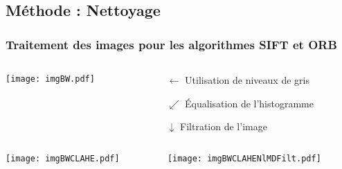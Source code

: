 \documentclass[8pt,aspectratio=169,hyperref={unicode=true}]{beamer}
\begin{document}
\subsection{Méthode : Nettoyage}
\subsubsection{Traitement des images pour les algorithmes SIFT et ORB}
\begin{frame}{\insertsubsection}{\insertsubsubsection}
    \begin{columns}
        \begin{column}{.5\textwidth}
            \texttt{[image: imgBW.pdf]}
        \end{column}
        \begin{column}{.5\textwidth}
            \begin{itemize}
                \item[$\longleftarrow$] Utilisation de niveaux de gris
                \item[$\swarrow$] Équalisation de l'histogramme
                \item[$\downarrow$] Filtration de l'image
            \end{itemize}
        \end{column}
    \end{columns}
    \begin{columns}
        \begin{column}{.5\textwidth}
            \texttt{[image: imgBWCLAHE.pdf]}
        \end{column}
        \begin{column}{.5\textwidth}
            \texttt{[image: imgBWCLAHENlMDFilt.pdf]}
        \end{column}
    \end{columns}
\end{frame}
\end{document}
